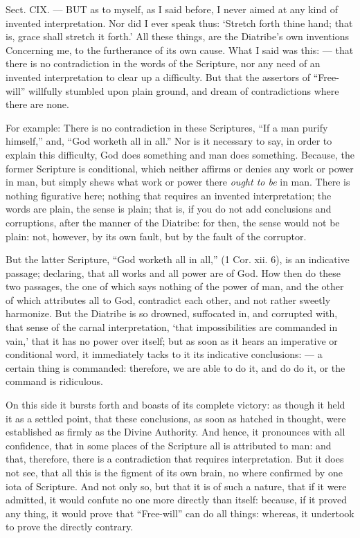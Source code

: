 
Sect. CIX. — BUT as to myself, as I said before, I never aimed at any kind of invented interpretation. Nor did I ever speak thus: ‘Stretch forth thine hand; that is, grace shall stretch it forth.’ All these things, are the Diatribe’s own inventions Concerning me, to the furtherance of its own cause. What I said was this: — that there is no contradiction in the words of the Scripture, nor any need of an invented interpretation to clear up a difficulty. But that the assertors of “Free-will” willfully stumbled upon plain ground, and dream of contradictions where there are none.

For example: There is no contradiction in these Scriptures, “If a man purify himself,” and, “God worketh all in all.” Nor is it necessary to say, in order to explain this difficulty, God does something and man does something. Because, the former Scripture is conditional, which neither affirms or denies any work or power in man, but simply shews what work or power there \emph{ought to be }in man. There is nothing figurative here; nothing that requires an invented interpretation; the words are plain, the sense is plain; that is, if you do not add conclusions and corruptions, after the manner of the Diatribe: for then, the sense would not be plain: not, however, by its own fault, but by the fault of the corruptor.

But the latter Scripture, “God worketh all in all,” (1 Cor. xii. 6), is an indicative passage; declaring, that all works and all power are of God. How then do these two passages, the one of which says nothing of the power of man, and the other of which attributes all to God, contradict each other, and not rather sweetly harmonize. But the Diatribe is so drowned, suffocated in, and corrupted with, that sense of the carnal interpretation, ‘that impossibilities are commanded in vain,’ that it has no power over itself; but as soon as it hears an imperative or conditional word, it immediately tacks to it its indicative conclusions: — a certain thing is commanded: therefore, we are able to do it, and do do it, or the command is ridiculous.

On this side it bursts forth and boasts of its complete victory: as though it held it as a settled point, that these conclusions, as soon as hatched in thought, were established as firmly as the Divine Authority. And hence, it pronounces with all confidence, that in some places of the Scripture all is attributed to man: and that, therefore, there is a contradiction that requires interpretation. But it does not see, that all this is the figment of its own brain, no where confirmed by one iota of Scripture. And not only so, but that it is of such a nature, that if it were admitted, it would confute no one more directly than itself: because, if it proved any thing, it would prove that “Free-will” can do all things: whereas, it undertook to prove the directly contrary.

